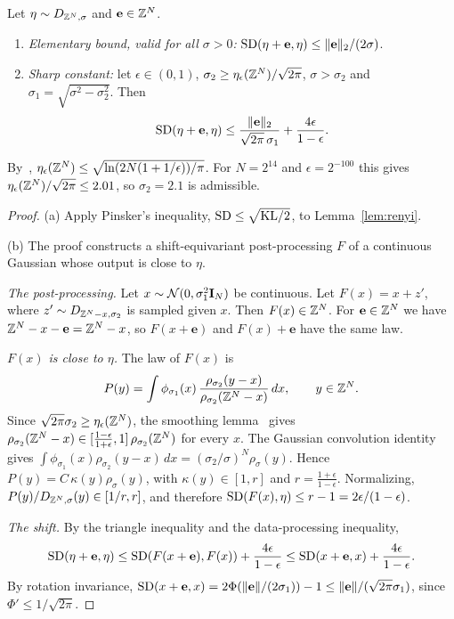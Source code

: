 \begin{lemma}\label{lem:smudge}
Let $\eta\sim D_{\mathbb{Z}^N,\sigma}$ and $\mathbf e\in\mathbb{Z}^N$.
\begin{enumerate}[nosep,label=(\alph*)]
  \item \emph{Elementary bound, valid for all $\sigma>0$:} $\mathrm{SD}(\eta+\mathbf e,\eta)\le\lVert \mathbf e\rVert_2/(2\sigma)$.
  \item \emph{Sharp constant:} let $\epsilon\in(0,1)$, $\sigma_2\ge\eta_\epsilon(\mathbb{Z}^N)/\sqrt{2\pi}$, $\sigma>\sigma_2$ and $\sigma_1=\sqrt{\sigma^2-\sigma_2^2}$. Then
  \[
    \mathrm{SD}(\eta+\mathbf e,\eta)\le\frac{\lVert \mathbf e\rVert_2}{\sqrt{2\pi}\,\sigma_1}+\frac{4\epsilon}{1-\epsilon}.
  \]
\end{enumerate}
By~\cite[Lemma~3.3]{MR07}, $\eta_\epsilon(\mathbb{Z}^N)\le\sqrt{\ln(2N(1+1/\epsilon))/\pi}$. For $N=2^{14}$ and $\epsilon=2^{-100}$ this gives $\eta_\epsilon(\mathbb{Z}^N)/\sqrt{2\pi}\le2.01$, so $\sigma_2=2.1$ is admissible.
\end{lemma}
\begin{proof}
(a) Apply Pinsker's inequality, $\mathrm{SD}\le\sqrt{\mathrm{KL}/2}$, to Lemma~\ref{lem:renyi}.

(b) The proof constructs a shift-equivariant post-processing $F$ of a continuous Gaussian whose output is close to $\eta$.

\emph{The post-processing.} Let $x\sim\mathcal N(0,\sigma_1^2\mathbf{I}_N)$ be continuous. Let $F(x)=x+z'$, where $z'\sim D_{\mathbb{Z}^N-x,\sigma_2}$ is sampled given $x$. Then $F(x)\in\mathbb{Z}^N$. For $\mathbf e\in\mathbb{Z}^N$ we have $\mathbb{Z}^N-x-\mathbf e=\mathbb{Z}^N-x$, so $F(x+\mathbf e)$ and $F(x)+\mathbf e$ have the same law.

\emph{$F(x)$ is close to $\eta$.} The law of $F(x)$ is
\[
  P(y)=\int\phi_{\sigma_1}(x)\,\frac{\rho_{\sigma_2}(y-x)}{\rho_{\sigma_2}(\mathbb{Z}^N-x)}\,dx ,\qquad y\in\mathbb{Z}^N .
\]
Since $\sqrt{2\pi}\sigma_2\ge\eta_\epsilon(\mathbb{Z}^N)$, the smoothing lemma~\cite[Lemma~4.4]{MR07} gives $\rho_{\sigma_2}(\mathbb{Z}^N-x)\in[\frac{1-\epsilon}{1+\epsilon},1]\,\rho_{\sigma_2}(\mathbb{Z}^N)$ for every $x$. The Gaussian convolution identity gives $\int\phi_{\sigma_1}(x)\rho_{\sigma_2}(y-x)\,dx=(\sigma_2/\sigma)^N\rho_\sigma(y)$. Hence $P(y)=C\,\kappa(y)\rho_\sigma(y)$, with $\kappa(y)\in[1,r]$ and $r=\frac{1+\epsilon}{1-\epsilon}$. Normalizing, $P(y)/D_{\mathbb{Z}^N,\sigma}(y)\in[1/r,r]$, and therefore $\mathrm{SD}(F(x),\eta)\le r-1=2\epsilon/(1-\epsilon)$.

\emph{The shift.} By the triangle inequality and the data-processing inequality,
\[
  \mathrm{SD}(\eta+\mathbf e,\eta)\le\mathrm{SD}(F(x+\mathbf e),F(x))+\frac{4\epsilon}{1-\epsilon}\le\mathrm{SD}(x+\mathbf e,x)+\frac{4\epsilon}{1-\epsilon}.
\]
By rotation invariance, $\mathrm{SD}(x+\mathbf e,x)=2\Phi(\lVert \mathbf e\rVert/(2\sigma_1))-1\le\lVert \mathbf e\rVert/(\sqrt{2\pi}\sigma_1)$, since $\Phi'\le1/\sqrt{2\pi}$.
\end{proof}

